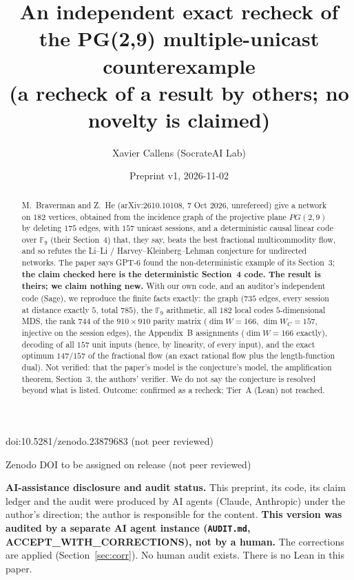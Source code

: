 \documentclass[10pt]{article}
\title{An independent exact recheck of the PG(2,9) multiple-unicast counterexample\\
{\large (a recheck of a result by others; no novelty is claimed)}}
\author{Xavier Callens (SocrateAI Lab)}
\date{Preprint v1, 2026-11-02}
\newcommand{\F}{\mathbb F}
\begin{document}
\maketitle
\begin{center}\small doi:10.5281/zenodo.23879683 \quad (not peer reviewed)\end{center}

\begin{center}\small Zenodo DOI to be assigned on release \quad (not peer reviewed)\end{center}

\noindent\textbf{AI-assistance disclosure and audit status.} This preprint, its code, its claim ledger and the audit were produced by AI agents (Claude, Anthropic) under the author's direction; the author is responsible for the content.
\textbf{This version was audited by a separate AI agent instance (\texttt{AUDIT.md}, ACCEPT\_WITH\_CORRECTIONS), not by a human.} The corrections are applied (Section~\ref{sec:corr}). No human audit exists. There is no Lean in this paper.

\begin{abstract}
\noindent M.~Braverman and Z.~He \cite{bh} (arXiv:2610.10108, 7 Oct 2026, unrefereed) give a network on $182$ vertices, obtained from the incidence graph of the projective plane $PG(2,9)$ by deleting $175$ edges, with $157$ unicast sessions, and a deterministic causal linear code over $\F_9$ (their Section~4) that, they say, beats the best fractional multicommodity flow, and so refutes the Li--Li / Harvey--Kleinberg--Lehman conjecture for undirected networks. The paper says GPT-6 found the non-deterministic example of its Section~3; \textbf{the claim checked here is the deterministic Section~4 code. The result is theirs; we claim nothing new.} With our own code, and an auditor's independent code (Sage), we reproduce the finite facts exactly: the graph ($735$ edges, every session at distance exactly $5$, total $785$), the $\F_9$ arithmetic, all $182$ local codes $5$-dimensional MDS, the rank $744$ of the $910\times910$ parity matrix ($\dim W=166$, $\dim W_C=157$, injective on the session edges), the Appendix~B assignments ($\dim W=166$ exactly), decoding of all $157$ unit inputs (hence, by linearity, of every input), and the exact optimum $147/157$ of the fractional flow (an exact rational flow plus the length-function dual). Not verified: that the paper's model is the conjecture's model, the amplification theorem, Section~3, the authors' verifier. We do not say the conjecture is resolved beyond what is listed. Outcome: confirmed as a recheck; Tier~A (Lean) not reached.
\end{abstract}
\end{document}
